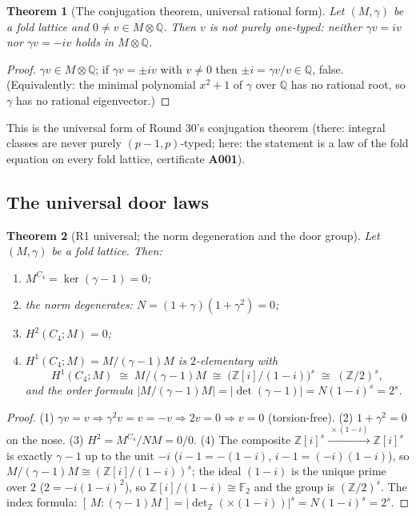 \documentclass[11pt]{article}
\newcommand{\Z}{\mathbb Z}
\newcommand{\Q}{\mathbb Q}
\newcommand{\F}{\mathbb F}
\newtheorem{theorem}{Theorem}[section]
\begin{document}
\begin{theorem}[The conjugation theorem, universal rational form]
\label{thm:conjugation}
Let $(M,\gamma)$ be a fold lattice and $0\ne v\in M\otimes\Q$. Then
$v$ is not purely one-typed: neither $\gamma v=iv$ nor
$\gamma v=-iv$ holds in $M\otimes\Q$.
\end{theorem}

\begin{proof}
$\gamma v\in M\otimes\Q$; if $\gamma v=\pm iv$ with $v\ne0$ then
$\pm i=\gamma v/v\in\Q$, false. (Equivalently: the minimal polynomial
$x^2+1$ of $\gamma$ over $\Q$ has no rational root, so $\gamma$ has no
rational eigenvector.)
\end{proof}

This is the universal form of Round 30's conjugation theorem (there:
integral classes are never purely $(p-1,p)$-typed; here: the statement
is a law of the fold equation on every fold lattice, certificate
\textbf{A001}).

\subsection{The universal door laws}

\begin{theorem}[R1 universal; the norm degeneration and the door group]
\label{thm:R1u}
Let $(M,\gamma)$ be a fold lattice. Then:
\begin{enumerate}
\item $M^{C_4}=\ker(\gamma-1)=0$;
\item the norm degenerates: $N=(1+\gamma)(1+\gamma^2)=0$;
\item $H^2(C_4;M)=0$;
\item $H^1(C_4;M)=M/(\gamma-1)M$ is $2$-elementary with
\[
H^1(C_4;M)\;\cong\;M/(\gamma-1)M\;\cong\;\bigl(\Z[i]/(1-i)\bigr)^s\;\cong\;(\Z/2)^s,
\]
and the order formula
$|M/(\gamma-1)M|=|\det(\gamma-1)|=N(1-i)^s=2^s$.
\end{enumerate}
\end{theorem}

\begin{proof}
(1) $\gamma v=v\Rightarrow\gamma^2v=v=-v\Rightarrow 2v=0\Rightarrow
v=0$ (torsion-free). (2) $1+\gamma^2=0$ on the nose.
(3) $H^2=M^{C_4}/NM=0/0$. (4) The composite
$\Z[i]^s\xrightarrow{\ \times(1-i)\ }\Z[i]^s$ is exactly
$\gamma-1$ up to the unit $-i$ ($i-1=-(1-i)$, $i-1=(-i)(1-i)$), so
$M/(\gamma-1)M\cong(\Z[i]/(1-i))^s$; the ideal $(1-i)$ is the unique
prime over $2$ ($2=-i(1-i)^2$), so $\Z[i]/(1-i)\cong\F_2$ and the
group is $(\Z/2)^s$. The index formula:
$[\,M:(\gamma-1)M\,]=|\det_{\Z}(\times(1-i))|^s=N(1-i)^s=2^s$.
\end{proof}
\end{document}
